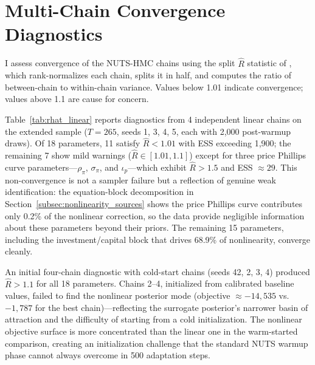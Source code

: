 \documentclass[12pt]{article}
\theoremstyle{plain}
\theoremstyle{definition}
\theoremstyle{remark}
\begin{document}
\section{Multi-Chain Convergence Diagnostics}
\label{app:multi_chain_convergence}

I assess convergence of the NUTS-HMC chains using the split $\hat{R}$ statistic of \citet{vehtari2021rank}, which rank-normalizes each chain, splits it in half, and computes the ratio of between-chain to within-chain variance. Values below 1.01 indicate convergence; values above 1.1 are cause for concern.

Table~\ref{tab:rhat_linear} reports diagnostics from 4 independent linear chains on the extended sample ($T = 265$, seeds 1, 3, 4, 5, each with 2{,}000 post-warmup draws). Of 18 parameters, 11 satisfy $\hat{R} < 1.01$ with ESS exceeding 1{,}900; the remaining 7 show mild warnings ($\hat{R} \in [1.01, 1.1]$) except for three price Phillips curve parameters---$\rho_\pi$, $\sigma_\pi$, and $\iota_p$---which exhibit $\hat{R} > 1.5$ and ESS $\approx 29$. This non-convergence is not a sampler failure but a reflection of genuine weak identification: the equation-block decomposition in Section~\ref{subsec:nonlinearity_sources} shows the price Phillips curve contributes only 0.2\% of the nonlinear correction, so the data provide negligible information about these parameters beyond their priors. The remaining 15 parameters, including the investment/capital block that drives 68.9\% of nonlinearity, converge cleanly.

An initial four-chain diagnostic with cold-start chains (seeds 42, 2, 3, 4) produced $\hat{R} > 1.1$ for all 18 parameters. Chains 2--4, initialized from calibrated baseline values, failed to find the nonlinear posterior mode (objective $\approx -14{,}535$ vs.\ $-1{,}787$ for the best chain)---reflecting the surrogate posterior's narrower basin of attraction and the difficulty of starting from a cold initialization. The nonlinear objective surface is more concentrated than the linear one in the warm-started comparison, creating an initialization challenge that the standard NUTS warmup phase cannot always overcome in 500 adaptation steps.
\end{document}
